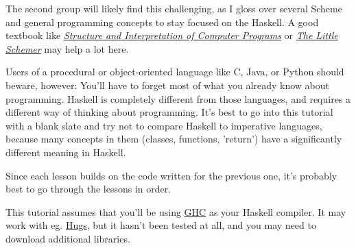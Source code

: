 The second group will likely find this challenging, as I gloss over several Scheme and general programming concepts to stay focused on the Haskell. A good textbook like \textit{\href{http://mitpress.mit.edu/sicp/full-text/book/book.html}{Structure and Interpretation of Computer Programs}} or \textit{\href{http://www.ccs.neu.edu/home/matthias/BTLS/}{The Little Schemer}} may help a lot here.
 
Users of a procedural or object-oriented language like C, Java, or Python should beware, however: You'll have to forget most of what you already know about programming. Haskell is completely different from those languages, and requires a different way of thinking about programming. It's best to go into this tutorial with a blank slate and try not to compare Haskell to imperative languages, because many concepts in them (classes, functions, 'return') have a significantly different meaning in Haskell.
 
Since each lesson builds on the code written for the previous one, it's probably best to go through the lessons in order.
 
This tutorial assumes that you'll be using \href{http://www.haskell.org/ghc/}{GHC} as your Haskell compiler. It may work with eg. \href{http://www.haskell.org/hugs/}{Hugs}, but it hasn't been tested at all, and you may need to download additional libraries.
